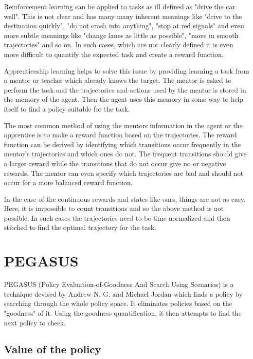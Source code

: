 \documentclass[BTech]{iitmdiss}
\begin{document}
Reinforcement learning can be applied to tasks as ill defined as "drive the car well". This is not clear and has many many inherent meanings like "drive to the destination quickly", "do not crash into anything", "stop at red signals" and even more subtle meanings like "change lanes as little as possible", "move in smooth trajectories" and so on. In such cases, which are not clearly defined it is even more difficult to quantify the expected task and create a reward function.

Apprenticeship learning \cite{ApprenticeshipLearning} helps to solve this issue by providing  learning a task from a mentor or teacher which already knows the target. The mentor is asked to perform the task and the trajectories and actions used by the mentor is stored in the memory of the agent. Then the agent uses this memory in some way to help itself to find a policy suitable for the task.

The most common method of using the mentors information in the agent or the apprentice is to make a reward function based on the trajectories. The reward function can be derived by identifying which transitions occur frequently in the mentor's trajectories and which ones do not. The frequent transitions should give a larger reward while the transitions that do not occur give no or negative rewards. The mentor can even specify which trajectories are bad and should not occur for a more balanced reward function.

In the case of the continuous rewards and states like ours, things are not as easy. Here, it is impossible to count transitions and so the above method is not possible. In such cases the trajectories need to be time normalized and then stitched to find the optimal trajectory for the task.


\chapter{PEGASUS}

PEGASUS \cite{PEGASUS} (Policy Evaluation-of-Goodness And Search Using Scenarios) is a technique devised by Andrew N. G. and Michael Jordan which finds a policy by searching through the whole policy space. It eliminates policies based on the "goodness" of it. Using the goodness quantification, it then attempts to find the next policy to check.

\section{Value of the policy}
\end{document}
